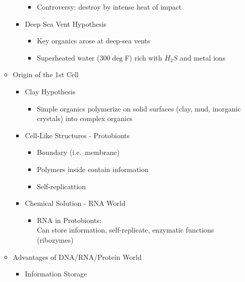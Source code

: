 \documentclass[12pt]{article}
\begin{document}
\begin{itemize}
\begin{itemize}
\begin{itemize}
\begin{itemize}
                    \item Controversy: destroy by intense heat of impact
                \end{itemize}
                \item Deep Sea Vent Hypothesis
                \begin{itemize}
                    \item Key organics arose at deep-sea vents
                    \item Superheated water ($300\deg$F) rich with $H_2S$ and metal ions
                \end{itemize}
            \end{itemize}
            \item Origin of the 1st Cell
            \begin{itemize}
                \item Clay Hypothesis
                \begin{itemize}
                    \item Simple organics polymerize on solid surfaces (clay, mud, inorganic crystals) into complex organics
                \end{itemize}
                \item Cell-Like Structures - Protobionts
                \begin{itemize}
                    \item Boundary (i.e.\ membrane)
                    \item Polymers inside contain information
                    \item Self-replicattion
                \end{itemize}
                \item Chemical Solution - RNA World
                \begin{itemize}
                    \item RNA in Protobionts: \\
                        Can store information, self-replicate, enzymatic functions (ribozymes)
                \end{itemize}
            \end{itemize}
            \item Advantages of DNA/RNA/Protein World
            \begin{itemize}
                \item Information Storage
                \begin{itemize}

\end{itemize}
\end{itemize}
\end{itemize}
\end{itemize}
\end{document}

